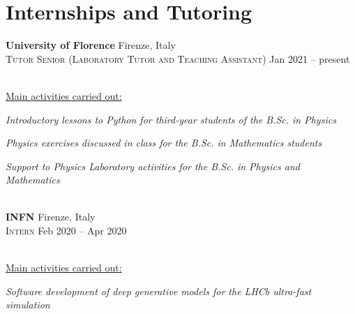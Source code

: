 \newcommand{\institution}[2]
  {\large \textbf{\color{hlcolor-0} #1} \hfill {\color{hlcolor-2} #2}}

\newcommand{\role}[2]
  {\small \color{hlcolor-1} 
  {\color{iconcolor} \faBriefcase}
  \textsc{#1} \hfill 
  {\color{iconcolor} \faClock}
  {#2}}


\section*{Internships and Tutoring}
\begin{cvcontent}
  \institution{University of Florence}{Firenze, Italy}\\ [0.5mm]
  \role{Tutor Senior (Laboratory Tutor and Teaching Assistant)}{Jan 2021 -- present}\\ [1.5mm]
  \\ [1.5mm]
  {\normalsize \color{maincolor} \ul{Main activities carried out:}\\ [1.5mm]
  \begin{itemize*}[label=\textcolor{iconcolor}{\textbullet}]
    \item \emph{Introductory lessons to Python for third-year 
      students of the B.Sc. in Physics}\\ [0.5mm]
    \item \emph{Physics exercises discussed in class for the 
      B.Sc. in Mathematics students}\\ [0.5mm]
    \item \emph{Support to Physics Laboratory activities for 
      the B.Sc. in Physics and Mathematics}
  \end{itemize*}}
  \\ [6mm]
  \institution{INFN}{Firenze, Italy}\\ [0.5mm]
  \role{Intern}{Feb 2020 -- Apr 2020}\\ [1.5mm]
  \\ [1.5mm]
  {\normalsize \color{maincolor} \ul{Main activities carried out:}\\ [1.5mm]
  \begin{itemize*}[label=\textcolor{iconcolor}{\textbullet}]
    \item \emph{Software development of deep generative models 
      for the LHCb ultra-fast simulation}\\ [0.5mm]

\end{itemize*}}
\end{cvcontent}
